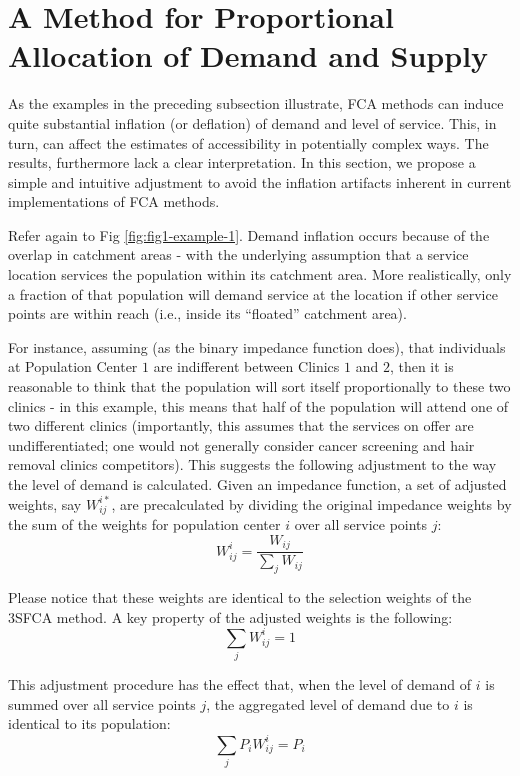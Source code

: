 \documentclass[10pt,letterpaper]{article}
\begin{document}
\section{A Method for Proportional Allocation of Demand and
Supply}\label{a-method-for-proportional-allocation-of-demand-and-supply}

As the examples in the preceding subsection illustrate, FCA methods can
induce quite substantial inflation (or deflation) of demand and level of
service. This, in turn, can affect the estimates of accessibility in
potentially complex ways. The results, furthermore lack a clear
interpretation. In this section, we propose a simple and intuitive
adjustment to avoid the inflation artifacts inherent in current
implementations of FCA methods.

Refer again to Fig \ref{fig:fig1-example-1}. Demand inflation occurs
because of the overlap in catchment areas - with the underlying
assumption that a service location services the population within its
catchment area. More realistically, only a fraction of that population
will demand service at the location if other service points are within
reach (i.e., inside its ``floated'' catchment area).

For instance, assuming (as the binary impedance function does), that
individuals at Population Center \(1\) are indifferent between Clinics
\(1\) and \(2\), then it is reasonable to think that the population will
sort itself proportionally to these two clinics - in this example, this
means that half of the population will attend one of two different
clinics (importantly, this assumes that the services on offer are
undifferentiated; one would not generally consider cancer screening and
hair removal clinics competitors). This suggests the following
adjustment to the way the level of demand is calculated. Given an
impedance function, a set of adjusted weights, say \(W^{i*}_{ij}\), are
precalculated by dividing the original impedance weights by the sum of
the weights for population center \(i\) over all service points \(j\):
\[
W_{ij}^{i} = \frac{W_{ij}}{\sum_j W_{ij}}
\]

Please notice that these weights are identical to the selection weights
of the 3SFCA method. A key property of the adjusted weights is the
following: \[
\sum_jW_{ij}^{i}=1
\]

This adjustment procedure has the effect that, when the level of demand
of \(i\) is summed over all service points \(j\), the aggregated level
of demand due to \(i\) is identical to its population: \[
\sum_j P_iW_{ij}^{i} = P_i
\]
\end{document}

